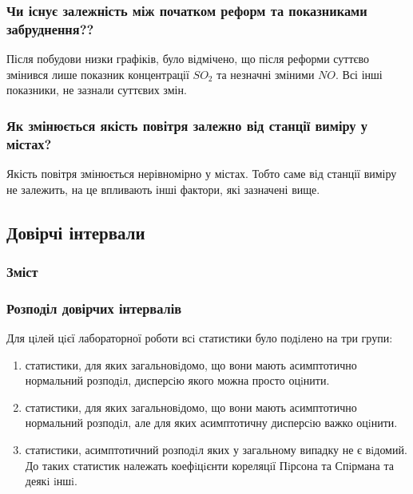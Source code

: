 \documentclass{beamer}
\begin{document}
\begin{frame}
  \frametitle{Чи існує залежність між початком реформ та показниками забруднення??}

  Після побудови низки графіків, було відмічено, що після реформи суттєво змінився 
  лише показник концентрації $SO_2$ та незначні зміними $NO$. Всі інші показники, не зазнали суттєвих змін.
  
\end{frame}

\begin{frame}
  \frametitle{Як змінюється якість повітря залежно від станції виміру у містах?}

  Якість повітря змінюється нерівномірно у містах. Тобто саме від станції виміру не залежить, 
    на це впливають інші фактори, які зазначені вище.

\end{frame}


\begin{frame}
  \section{Довірчі інтервали}

  \frametitle{Зміст}
  \tableofcontents[currentsection]
\end{frame}

\begin{frame}
  \frametitle{Розподіл довірчих інтервалів}

  Для цiлей цiєї лабораторної роботи всi статистики було подiлено на три групи:
  \begin{enumerate}
    \renewcommand{\theenumi}{\Roman{enumi}}
    \item  статистики, для яких загальновiдомо, що вони мають асимптотично нормальний розподiл,
    дисперсiю якого можна просто оцiнити. 
     
    \item статистики, для яких загальновiдомо, що вони мають асимптотично нормальний розподiл, але для
    яких асимптотичну дисперсiю важко оцiнити. 

    \item  статистики, асимптотичний розподiл яких у загальному випадку не є вiдомий. До таких статистик
    належать коефiцiєнти кореляцiї Пiрсона та Спiрмана та деякi iншi.
  \end{enumerate}
\end{frame} 
\end{document}
